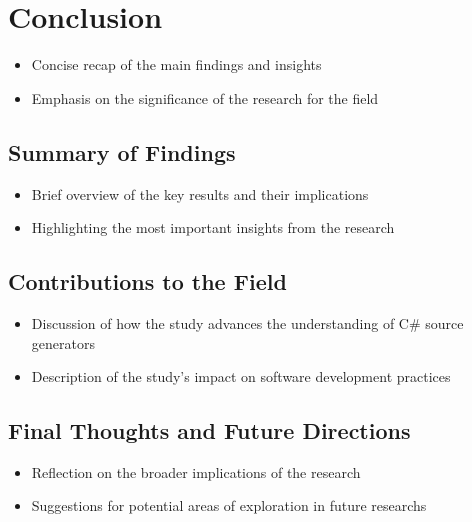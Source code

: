 \chapter{Conclusion}

\begin{itemize}
    \item Concise recap of the main findings and insights
    \item Emphasis on the significance of the research for the field
\end{itemize}

\section{Summary of Findings}

\begin{itemize}
    \item Brief overview of the key results and their implications
    \item Highlighting the most important insights from the research
\end{itemize}

\section{Contributions to the Field}

\begin{itemize}
    \item Discussion of how the study advances the understanding of C\# source generators
    \item Description of the study's impact on software development practices
\end{itemize}

\section{Final Thoughts and Future Directions}

\begin{itemize}
    \item Reflection on the broader implications of the research
    \item Suggestions for potential areas of exploration in future researchs
\end{itemize}
